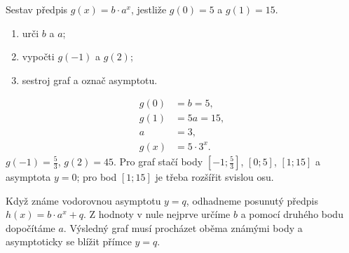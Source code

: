 \documentclass[11pt,a4paper]{article}
\begin{document}
\begin{prikladReseniBox}[title={Příklad 3}]
Sestav předpis $g(x)=b\cdot a^x$, jestliže $g(0)=5$ a $g(1)=15$.
\begin{enumerate}[label=\alph*)]
\item urči $b$ a $a$;
\item vypočti $g(-1)$ a $g(2)$;
\item sestroj graf a označ asymptotu.
\end{enumerate}
\tcblower
\[
\begin{aligned}
g(0)&=b=5,\\
g(1)&=5a=15,\\
a&=3,\\
g(x)&=5\cdot3^x.
\end{aligned}
\]
$g(-1)=\frac{5}{3}$, $g(2)=45$. Pro graf stačí body $[-1;\frac{5}{3}]$, $[0;5]$, $[1;15]$ a asymptota $y=0$; pro bod $[1;15]$ je třeba rozšířit svislou osu.\begin{center}
\end{center}
\end{prikladReseniBox}
Když známe vodorovnou asymptotu $y=q$, odhadneme posunutý předpis $h(x)=b\cdot a^x+q$. Z hodnoty v nule nejprve určíme $b$ a pomocí druhého bodu dopočítáme $a$. Výsledný graf musí procházet oběma známými body a asymptoticky se blížit přímce $y=q$.
\end{document}
